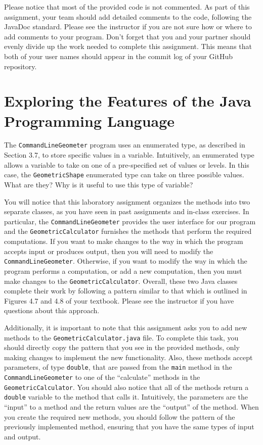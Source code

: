 \documentclass[11pt]{article}
\begin{document}
Please notice that most of the provided code is not commented. As part of this assignment, your team should add
detailed comments to the code, following the JavaDoc standard. Please see the instructor if you are not sure how or
where to add comments to your program. Don't forget that you and your partner should evenly divide up the work needed to
complete this assignment. This means that both of your user names should appear in the commit log of your GitHub
repository.

\section*{Exploring the Features of the Java Programming Language}

The {\tt CommandLineGeometer} program uses an enumerated type, as described in
Section 3.7, to store specific values in a variable. Intuitively, an enumerated
type allows a variable to take on one of a pre-specified set of values or
levels. In this case, the {\tt GeometricShape} enumerated type can take on three
possible values. What are they? Why is it useful to use this type of variable?

You will notice that this laboratory assignment organizes the methods into two
separate classes, as you have seen in past assignments and in-class exercises.
In particular, the {\tt CommandLineGeometer} provides the user interface for our
program and the {\tt GeometricCalculator} furnishes the methods that perform the
required computations.  If you want to make changes to the way in which the
program accepts input or produces output, then you will need to modify the {\tt
CommandLineGeometer}. Otherwise, if you want to modify the way in which the
program performs a computation, or add a new computation, then you must make
changes to the {\tt GeometricCalculator}. Overall, these two Java classes
complete their work by following a pattern similar to that which is outlined in
Figures 4.7 and 4.8 of your textbook. Please see the instructor if you have
questions about this approach.

Additionally, it is important to note that this assignment asks you to add new
methods to the {\tt GeometricCalculator.java} file. To complete this task, you
should directly copy the pattern that you see in the provided methods, only
making changes to implement the new functionality. Also, these methods accept
parameters, of type {\tt double}, that are passed from the {\tt main} method in
the {\tt CommandLineGeometer} to one of the ``calculate'' methods in the {\tt
GeometricCalculator}. You should also notice that all of the methods return a
{\tt double} variable to the method that calls it. Intuitively, the parameters
are the ``input'' to a method and the return values are the ``output'' of the
method. When you create the required new methods, you should follow the pattern
of the previously implemented method, ensuring that you have the same types of
input and output.
\end{document}
